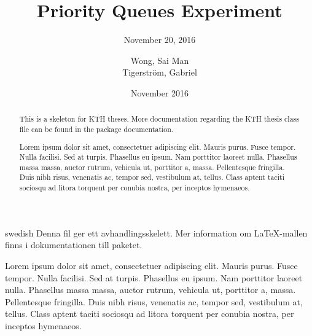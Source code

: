 \documentclass[a4paper,11pt]{kth-mag}
\title{Priority Queues Experiment}
\subtitle{November 20, 2016}
\author{Wong, Sai Man\\ Tigerstr\"{o}m, Gabriel}
\date{November 2016}
\begin{document}
\frontmatter
\pagestyle{empty}
\removepagenumbers
\maketitle
{}

\begin{abstract}
This is a skeleton for KTH theses. More documentation
regarding the KTH thesis class file can be found in
the package documentation.

Lorem ipsum dolor sit amet, consectetuer adipiscing elit. Mauris
purus. Fusce tempor. Nulla facilisi. Sed at turpis. Phasellus eu
ipsum. Nam porttitor laoreet nulla. Phasellus massa massa, auctor
rutrum, vehicula ut, porttitor a, massa. Pellentesque fringilla. Duis
nibh risus, venenatis ac, tempor sed, vestibulum at, tellus. Class
aptent taciti sociosqu ad litora torquent per conubia nostra, per
inceptos hymenaeos.
\end{abstract}
\clearpage

\begin{foreignabstract}{swedish}
Denna fil ger ett avhandlingsskelett.
Mer information om \LaTeX-mallen finns i
dokumentationen till paketet.

Lorem ipsum dolor sit amet, consectetuer adipiscing elit. Mauris
purus. Fusce tempor. Nulla facilisi. Sed at turpis. Phasellus eu
ipsum. Nam porttitor laoreet nulla. Phasellus massa massa, auctor
rutrum, vehicula ut, porttitor a, massa. Pellentesque fringilla. Duis
nibh risus, venenatis ac, tempor sed, vestibulum at, tellus. Class
aptent taciti sociosqu ad litora torquent per conubia nostra, per
inceptos hymenaeos.
\end{foreignabstract}
\clearpage

\tableofcontents*
\mainmatter
\pagestyle{newchap}
\end{document}
